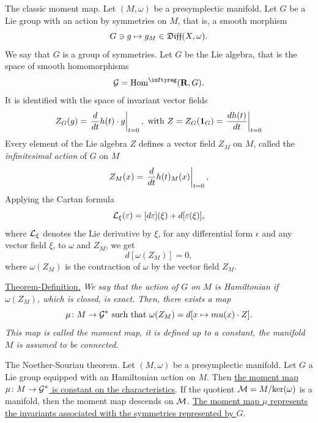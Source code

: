 \begin{Article}{The classic moment map.}
  Let $(M,\omega)$ be a presymplectic manifold.
  Let  $G$ be a Lie group with an action by symmetries on $M$,
  that is,
  a smooth morphism
  $$%
    G \ni g \mapsto g_M \in \Diff(X,\omega).
    $$%
  We say that $G$ is a group of symmetries.
  Let $G$ be the Lie algebra,
  that is the space of smooth homomorphisms
  $$%
    \cG = \Hom^\infty(\RR,G).
    $$%
  It is identified with the space of invariant vector fields
  $$%
    Z_G(g) = \left.{d \over dt} h(t)\cdot g\right|_{t=0},
    \SpacedText{with}
    Z = Z_G(\Id_G) =  \left.{d h(t) \over dt}
    \right|_{t=0}
    $$%
  Every element of the Lie algebra $Z$ defines a vector field $Z_M$ on $M$,
  called the \emph{infinitesimal action} of $G$ on $M$
  $$%
    Z_M(x) = \left.{d \over dt} h(t)_M(x)\right|_{t=0},
    $$%
  Applying the Cartan formula
  $$%
    \cL_\xi(\epsilon) = [d\epsilon](\xi) + d[\epsilon(\xi)],
    $$%
  where $\mathcal{L}_\xi$ denotes the Lie derivative by $\xi$,
  for any differential form $\epsilon$ and any vector field $\xi$,
  to $\omega$ and $Z_M$,
  we get
  $$%
    d[\omega(Z_M)] = 0,
    $$%
  where $\omega(Z_M)$ is the contraction of $\omega$ by the vector field $Z_M$.
  
  \uline{Theorem-Definition.} {\itshape We say that the action of $G$ on $M$ is \emph{Hamiltonian} if $\omega(Z_M)$,
  which is closed,
  is exact.
  Then,
  there exists a map
  $$%
    \mu \colon M \to \cG^*
    \SpacedText{such that}
    \omega(Z_M) = d[x \mapsto mu(x)\cdot Z].
    $$%
  This map is called the \emph{moment map},
  it is defined up to a constant,
  the manifold $M$ is assumed to be connected.
  }
\end{Article}

\begin{Article}{The Noether-Souriau theorem.}{}
  Let $(M,\omega)$ be a presymplectic manifold.
  Let $G$ a Lie group equipped with an Hamiltonian action on $M$.
  Then \uline{the moment map $\mu \colon M \to \mathcal{G}^*$ is constant on the characteristics}.
  If the quotient $\mathcal{M} = M/\mathrm{ker}(\omega)$ is a manifold,
  then the moment map descends on $\mathcal{M}$.
  \uline{The moment map $\mu$ represents the invariants associated with the symmetries represented by $G$}.
\end{Article}

